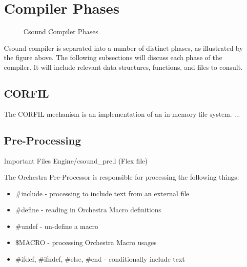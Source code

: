 \documentclass[]{book}
\begin{document}
\section{Compiler Phases}

\begin{figure}[htbp]
\centerline{}
\caption{Csound Compiler Phases}
\label{overview}
\end{figure}

Csound compiler is separated into a number of distinct phases, as illustrated by the figure above. The following subsections will discuss each phase of the compiler.  It will include relevant data structures, functions, and files to consult.  

\subsection{CORFIL}

The CORFIL mechanism is an implementation of an in-memory file system. ...

\subsection{Pre-Processing}

\begin{bclogo}[couleur=blue!30,arrondi=0.1,ombre=true,logo=\bcetoile]
{Important Files}
Engine/csound\_pre.l (Flex file)
\end{bclogo}

The Orchestra Pre-Processor is responsible for processing the following things:

\begin{itemize}
  \item \#include - processing to include text from an external file
  \item \#define - reading in Orchestra Macro definitions
  \item \#undef - un-define a macro
  \item \$MACRO - processing Orchestra Macro usages
  \item \#ifdef, \#ifndef, \#else, \#end - conditionally include text
\end{itemize}
\end{document}
